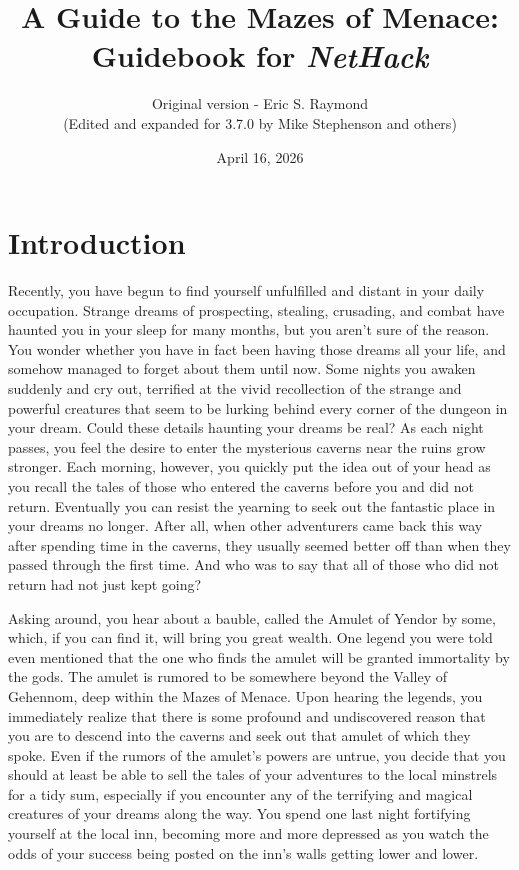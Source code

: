 \documentclass[titlepage]{article}
\begin{document}
%
%

\title{\LARGE A Guide to the Mazes of Menace:\\
\Large Guidebook for \textit{NetHack}}

\author{Original version - Eric S. Raymond\\
(Edited and expanded for 3.7.0 by Mike Stephenson and others)}
\date{April 16, 2026}

\maketitle

\section{Introduction}


Recently, you have begun to find yourself unfulfilled and distant
in your daily occupation.  Strange dreams of prospecting, stealing,
crusading, and combat have haunted you in your sleep for many months,
but you aren't sure of the reason.  You wonder whether you have in
fact been having those dreams all your life, and somehow managed to
forget about them until now.  Some nights you awaken suddenly
and cry out, terrified at the vivid recollection of the strange and
powerful creatures that seem to be lurking behind every corner of the
dungeon in your dream.  Could these details haunting your dreams be real?
As each night passes, you feel the desire to enter the mysterious caverns
near the ruins grow stronger.  Each morning, however, you quickly put
the idea out of your head as you recall the tales of those who entered
the caverns before you and did not return.  Eventually you can resist
the yearning to seek out the fantastic place in your dreams no longer.
After all, when other adventurers came back this way after spending time
in the caverns, they usually seemed better off than when they passed
through the first time.  And who was to say that all of those who did
not return had not just kept going?

Asking around, you hear about a bauble, called the Amulet of Yendor by some,
which, if you can find it, will bring you great wealth.  One legend you were
told even mentioned that the one who finds the amulet will be granted
immortality by the gods.  The amulet is rumored to be somewhere beyond the
Valley of Gehennom, deep within the Mazes of Menace.  Upon hearing the
legends, you immediately realize that there is some profound and
undiscovered reason that you are to descend into the caverns and seek
out that amulet of which they spoke.  Even if the rumors of the amulet's
powers are untrue, you decide that you should at least be able to sell the
tales of your adventures to the local minstrels for a tidy sum, especially
if you encounter any of the terrifying and magical creatures of
your dreams along the way.  You spend one last night fortifying yourself
at the local inn, becoming more and more depressed as you watch the odds
of your success being posted on the inn's walls getting lower and lower.
\end{document}
